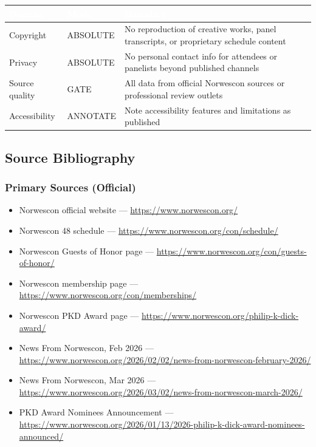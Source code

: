 \documentclass[11pt,letterpaper]{article}
\newcommand{\tableheader}[1]{\textbf{\sffamily\textcolor{white}{#1}}}
\begin{document}
\begin{center}
\begin{tabularx}{\textwidth}{L{3.5cm}L{2cm}X}
\toprule
{}
\tableheader{Domain} & \tableheader{Mode} & \tableheader{Boundary} \\
\midrule
Copyright & ABSOLUTE & No reproduction of creative works, panel transcripts, or proprietary schedule content \\
Privacy & ABSOLUTE & No personal contact info for attendees or panelists beyond published channels \\
Source quality & GATE & All data from official Norwescon sources or professional review outlets \\
Accessibility & ANNOTATE & Note accessibility features and limitations as published \\
\bottomrule
\end{tabularx}
\end{center}

\subsection{Source Bibliography}

\subsubsection{Primary Sources (Official)}
\begin{itemize}[leftmargin=2em]
\item Norwescon official website --- \url{https://www.norwescon.org/}
\item Norwescon 48 schedule --- \url{https://www.norwescon.org/con/schedule/}
\item Norwescon Guests of Honor page --- \url{https://www.norwescon.org/con/guests-of-honor/}
\item Norwescon membership page --- \url{https://www.norwescon.org/con/memberships/}
\item Norwescon PKD Award page --- \url{https://www.norwescon.org/philip-k-dick-award/}
\item News From Norwescon, Feb 2026 --- \url{https://www.norwescon.org/2026/02/02/news-from-norwescon-february-2026/}
\item News From Norwescon, Mar 2026 --- \url{https://www.norwescon.org/2026/03/02/news-from-norwescon-march-2026/}
\item PKD Award Nominees Announcement --- \url{https://www.norwescon.org/2026/01/13/2026-philip-k-dick-award-nominees-announced/}
\end{itemize}
\end{document}

